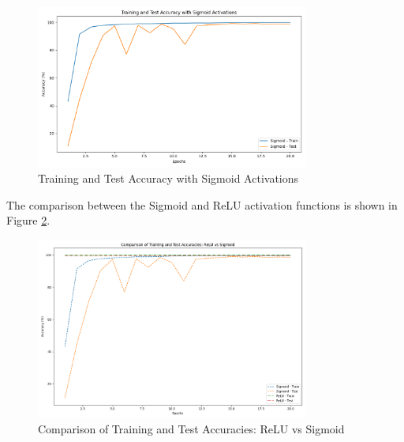 \documentclass[10pt,letter,notitlepage]{article}
\begin{document}
\begin{center}
\begin{figure}[H]
    \centering
    \includegraphics[width=0.8\textwidth]{sigmoid_activation_performance.png}
    \caption{Training and Test Accuracy with Sigmoid Activations}
    \label{fig:sigmoid_performance}
\end{figure}

The comparison between the Sigmoid and ReLU activation functions is shown in Figure \ref{fig:relu_vs_sigmoid}.

\begin{figure}[H]
    \centering
    \includegraphics[width=0.8\textwidth]{comparison_relu_sigmoid.png}
    \caption{Comparison of Training and Test Accuracies: ReLU vs Sigmoid}
    \label{fig:relu_vs_sigmoid}
\end{figure}


\end{center}
\end{document}
